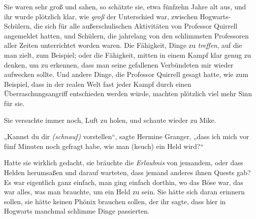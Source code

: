 Sie waren sehr groß und sahen, so schätzte sie, etwa fünfzehn Jahre alt aus, und ihr wurde plötzlich klar, wie \emph{groß} der Unterschied war, zwischen Hogwarts-Schülern, die sich für alle außerschulischen Aktivitäten von Professor Quirrell angemeldet hatten, und Schülern, die jahrelang von den schlimmsten Professoren aller Zeiten unterrichtet worden waren. Die Fähigkeit, Dinge zu \emph{treffen}, auf die man zielt, zum Beispiel; oder die Fähigkeit, mitten in einem Kampf klar genug zu denken, um zu erkennen, dass man seine gefallenen Verbündeten mir  wieder aufwecken sollte. Und andere Dinge, die Professor Quirrell gesagt hatte, wie zum Beispiel, dass in der realen Welt fast jeder Kampf durch einen Überraschungsangriff entschieden werden würde, machten plötzlich viel mehr Sinn für sie.

Sie versuchte immer noch, Luft zu holen, und schaute wieder zu Mike.

„Kannst du dir \emph{(schnauf)} vorstellen“, sagte Hermine Granger, „dass ich mich vor fünf Minuten noch gefragt habe, wie man (keuch) ein Held wird?“

Hatte sie wirklich gedacht, sie bräuchte die \emph{Erlaubnis} von jemandem, oder dass Helden herumsaßen und darauf warteten, dass jemand anderes ihnen Quests gab? Es war eigentlich ganz einfach, man ging einfach dorthin, wo das Böse war, das war alles, was man brauchte, um ein Held zu sein. Sie hätte sich daran erinnern sollen, sie hätte keinen Phönix brauchen sollen, der ihr sagte, dass hier in Hogwarts manchmal schlimme Dinge passierten.

